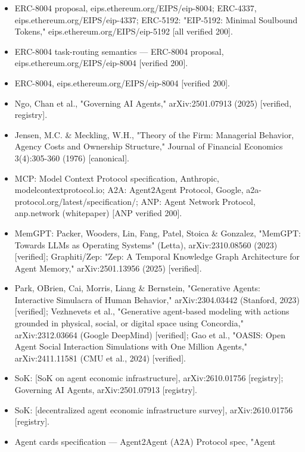 \documentclass[
]{article}
\begin{document}
\begin{itemize}
  eips.ethereum.org/EIPS/eip-8004 (mandate/auth-role field defined in
  the EIP) {[}verified 200{]}.
\item
  ERC-8004 proposal, eips.ethereum.org/EIPS/eip-8004; ERC-4337,
  eips.ethereum.org/EIPS/eip-4337; ERC-5192: "EIP-5192: Minimal
  Soulbound Tokens," eips.ethereum.org/EIPS/eip-5192 {[}all verified
  200{]}.
\item
  ERC-8004 task-routing semantics --- ERC-8004 proposal,
  eips.ethereum.org/EIPS/eip-8004 {[}verified 200{]}.
\item
  ERC-8004, eips.ethereum.org/EIPS/eip-8004 {[}verified 200{]}.
\item
  Ngo, Chan et al., "Governing AI Agents," arXiv:2501.07913 (2025)
  {[}verified, registry{]}.
\item
  Jensen, M.C. \& Meckling, W.H., "Theory of the Firm: Managerial
  Behavior, Agency Costs and Ownership Structure," Journal of Financial
  Economics 3(4):305-360 (1976) {[}canonical{]}.
\item
  MCP: Model Context Protocol specification, Anthropic,
  modelcontextprotocol.io; A2A: Agent2Agent Protocol, Google,
  a2a-protocol.org/latest/specification/; ANP: Agent Network Protocol,
  anp.network (whitepaper) {[}ANP verified 200{]}.
\item
  MemGPT: Packer, Wooders, Lin, Fang, Patel, Stoica \& Gonzalez,
  "MemGPT: Towards LLMs as Operating Systems" (Letta), arXiv:2310.08560
  (2023) {[}verified{]}; Graphiti/Zep: "Zep: A Temporal Knowledge Graph
  Architecture for Agent Memory," arXiv:2501.13956 (2025)
  {[}verified{]}.
\item
  Park, O\textquotesingle Brien, Cai, Morris, Liang \& Bernstein,
  "Generative Agents: Interactive Simulacra of Human Behavior,"
  arXiv:2304.03442 (Stanford, 2023) {[}verified{]}; Vezhnevets et al.,
  "Generative agent-based modeling with actions grounded in physical,
  social, or digital space using Concordia," arXiv:2312.03664 (Google
  DeepMind) {[}verified{]}; Gao et al., "OASIS: Open Agent Social
  Interaction Simulations with One Million Agents," arXiv:2411.11581
  (CMU et al., 2024) {[}verified{]}.
\item
  SoK: {[}SoK on agent economic infrastructure{]}, arXiv:2610.01756
  {[}registry{]}; Governing AI Agents, arXiv:2501.07913 {[}registry{]}.
\item
  SoK: {[}decentralized agent economic infrastructure survey{]},
  arXiv:2610.01756 {[}registry{]}.
\item
  Agent cards specification --- Agent2Agent (A2A) Protocol spec, "Agent

\end{itemize}
\end{document}
